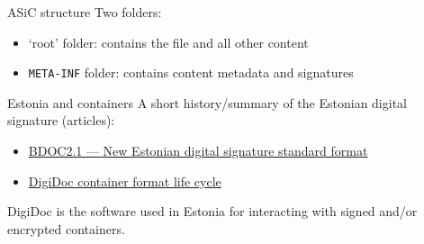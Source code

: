 \begin{frame}{ASiC structure}
  Two folders:
  \begin{itemize}[<+(1)->]
    \item `root' folder: contains the file and all other content
    \item \texttt{META-INF} folder: contains content metadata and signatures
  \end{itemize}
\end{frame}

\begin{frame}{Estonia and containers}
  A short history/summary of the Estonian digital signature (articles):
  \begin{itemize}
    \item \href{https://www.id.ee/en/article/bdoc2-1-new-estonian-digital-signature-standard-format/}{BDOC2.1 --- New Estonian digital signature standard format}
    \item \href{https://www.id.ee/en/article/digidoc-container-format-life-cycle-2/}{DigiDoc container format life cycle}
  \end{itemize}

  \vspace*{1em}

  \pause
  DigiDoc is the software used in Estonia for interacting with signed and/or encrypted containers.
\end{frame}


